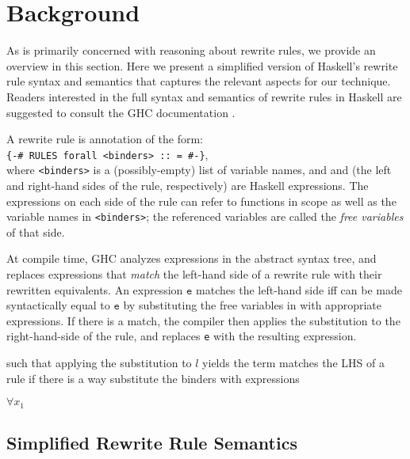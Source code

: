 \section{Background}
\label{sec:background}

As \Rulecheck is primarily concerned with reasoning about rewrite rules, we
provide an overview in this section. Here we present a simplified version of
Haskell's rewrite rule syntax and semantics that captures the relevant aspects
for our technique. Readers interested in the full syntax and semantics of
rewrite rules in Haskell are suggested to consult the GHC documentation
\cite{userguide}.

A rewrite rule is annotation of the form:\\ \texttt{\{-\# RULES forall <binders>
:: \rlhs = \rrhs \#-\}},\\ where \texttt{<binders>} is a (possibly-empty) list
of variable names, and \rlhs and \rrhs (the left and
right-hand sides of the rule, respectively) are Haskell expressions. The
expressions on each side of the rule can refer to functions in scope as well as
the variable names in \texttt{<binders>}; the referenced variables are called
the \textit{free variables} of that side.

At compile time, GHC analyzes expressions in the abstract syntax tree, and
replaces expressions that \textit{match} the left-hand side of a rewrite rule
with their rewritten equivalents. An expression $\texttt{e}$ matches the
left-hand side \rlhs iff \rlhs can be made syntactically equal to $\texttt{e}$
by substituting the free variables in \rlhs with appropriate expressions. If
there is a match, the compiler then applies the substitution to the
right-hand-side of the rule, and replaces \texttt{e} with the resulting
expression.

such that applying the substitution to $l$ yields the term
matches the LHS of a rule if there is a way substitute the binders with expressions

$ \forall x_{1} $

\subsection{Simplified Rewrite Rule Semantics}
